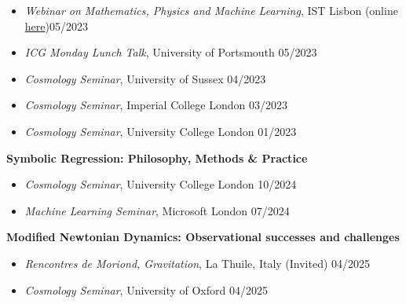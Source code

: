 \documentclass[11pt]{article}
\newenvironment{outerlist}[1][\enskip\textbullet]%
        {\begin{itemize}[#1]}{\end{itemize}%
         \vspace{-.6\baselineskip}}
\newcommand{\blankline}{\quad\pagebreak[2]}
\begin{document}
\begin{outerlist}
\item[] \textit{Webinar on Mathematics, Physics and Machine Learning}, IST Lisbon (online \href{https://mpml.tecnico.ulisboa.pt/seminars?id=6974}{here})\hfill 05/2023 \\
\vspace{-1.4\baselineskip}
\item[] \textit{ICG Monday Lunch Talk}, University of Portsmouth \hfill 05/2023 \\
\vspace{-1.4\baselineskip}
\item[] \textit{Cosmology Seminar}, University of Sussex \hfill 04/2023 \\
\vspace{-1.4\baselineskip}
\item[] \textit{Cosmology Seminar}, Imperial College London \hfill 03/2023 \\
\vspace{-1.4\baselineskip}
\item[] \textit{Cosmology Seminar}, University College London \hfill 01/2023 \\
\vspace{-1.4\baselineskip}
\end{outerlist}

\blankline

\textbf{Symbolic Regression: Philosophy, Methods \& Practice}
\vspace{-0.35\baselineskip}
\begin{outerlist}
\item[] \textit{Cosmology Seminar}, University College London \hfill 10/2024 \\
\vspace{-1.4\baselineskip}
\item[] \textit{Machine Learning Seminar}, Microsoft London \hfill 07/2024 \\
\vspace{-1.4\baselineskip}
\end{outerlist}

\blankline

\textbf{Modified Newtonian Dynamics: Observational successes and challenges}
\vspace{-0.35\baselineskip}
\begin{outerlist}
\item[] \textit{Rencontres de Moriond, Gravitation}, La Thuile, Italy (Invited) \hfill 04/2025 \\
\vspace{-1.4\baselineskip}
\item[] \textit{Cosmology Seminar}, University of Oxford \hfill 04/2025 \\
\vspace{-1.4\baselineskip}
\end{outerlist}
\end{document}

